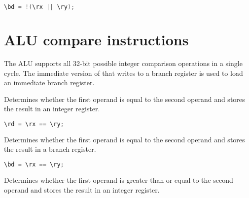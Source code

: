 \begin{lstlisting}[numbers=none, basicstyle=\ttfamily\footnotesize, language=C++]
\bd = !(\rx || \ry);
\end{lstlisting}

\section{ALU compare instructions}


The \rvex{} ALU supports all 32-bit possible integer comparison operations in a
single cycle. The immediate version of  that writes to a branch
register is used to load an immediate branch register.

Determines whether the first operand is equal to the second operand and stores
the result in an integer register.

\begin{lstlisting}[numbers=none, basicstyle=\ttfamily\footnotesize, language=C++]
\rd = \rx == \ry;
\end{lstlisting}

Determines whether the first operand is equal to the second operand and stores
the result in a branch register.

\begin{lstlisting}[numbers=none, basicstyle=\ttfamily\footnotesize, language=C++]
\bd = \rx == \ry;
\end{lstlisting}

Determines whether the first operand is greater than or equal to the second
operand and stores the result in an integer register.

